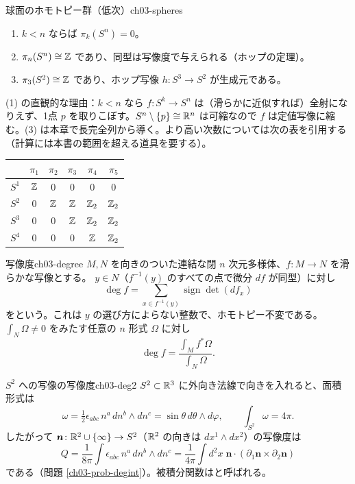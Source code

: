 \begin{mythm}{球面のホモトピー群（低次）}{ch03-spheres}
\begin{enumerate}
\item $k<n$ ならば $\pi_k(S^n)=0$。
\item $\pi_n(S^n)\cong\mathbb{Z}$ であり、同型は写像度で与えられる（ホップの定理）。
\item $\pi_3(S^2)\cong\mathbb{Z}$ であり、ホップ写像 $h\colon S^3\to S^2$ が生成元である。
\end{enumerate}
\end{mythm}
(1) の直観的な理由：$k<n$ なら $f\colon S^k\to S^n$ は（滑らかに近似すれば）全射になりえず、1点 $p$ を取りこぼす。$S^n\setminus\{p\}\cong\mathbb{R}^n$ は可縮なので $f$ は定値写像に縮む。(3) は本章で長完全列から導く。より高い次数については次の表を引用する（計算には本書の範囲を超える道具を要する）。
\begin{center}
\renewcommand{\arraystretch}{1.15}
\begin{tabular}{c|ccccc}
 & $\pi_1$ & $\pi_2$ & $\pi_3$ & $\pi_4$ & $\pi_5$\\ \hline
$S^1$ & $\mathbb{Z}$ & $0$ & $0$ & $0$ & $0$\\
$S^2$ & $0$ & $\mathbb{Z}$ & $\mathbb{Z}$ & $\mathbb{Z}_2$ & $\mathbb{Z}_2$\\
$S^3$ & $0$ & $0$ & $\mathbb{Z}$ & $\mathbb{Z}_2$ & $\mathbb{Z}_2$\\
$S^4$ & $0$ & $0$ & $0$ & $\mathbb{Z}$ & $\mathbb{Z}_2$
\end{tabular}
\end{center}

\begin{mydef}{写像度}{ch03-degree}
$M,N$ を向きのついた連結な閉 $n$ 次元多様体、$f\colon M\to N$ を滑らかな写像とする。 $y\in N$（$f^{-1}(y)$ のすべての点で微分 $df$ が同型）に対し
\[
\deg f=\sum_{x\in f^{-1}(y)}\operatorname{sign}\det(df_x)
\]
をという。これは $y$ の選び方によらない整数で、ホモトピー不変である。$\int_N\Omega\neq0$ をみたす任意の $n$ 形式 $\Omega$ に対し
\[
\deg f=\frac{\int_Mf^*\Omega}{\int_N\Omega}.
\]
\end{mydef}

\begin{myex}{$S^2$ への写像の写像度}{ch03-deg2}
$S^2\subset\mathbb{R}^3$ に外向き法線で向きを入れると、面積形式は
\[
\omega=\tfrac12\epsilon_{abc}\,n^a\,dn^b\wedge dn^c=\sin\theta\,d\theta\wedge d\varphi,\qquad\int_{S^2}\omega=4\pi .
\]
したがって $\bm n\colon\mathbb{R}^2\cup\{\infty\}\to S^2$（$\mathbb{R}^2$ の向きは $dx^1\wedge dx^2$）の写像度は
\begin{equation}
Q=\frac{1}{8\pi}\int\epsilon_{abc}\,n^a\,dn^b\wedge dn^c=\frac1{4\pi}\int d^2x\;\bm n\cdot(\partial_1\bm n\times\partial_2\bm n)\label{eq:ch03-Q}
\end{equation}
である（問題 \ref{ch03-prob-degint}）。被積分関数はと呼ばれる。
\end{myex}

